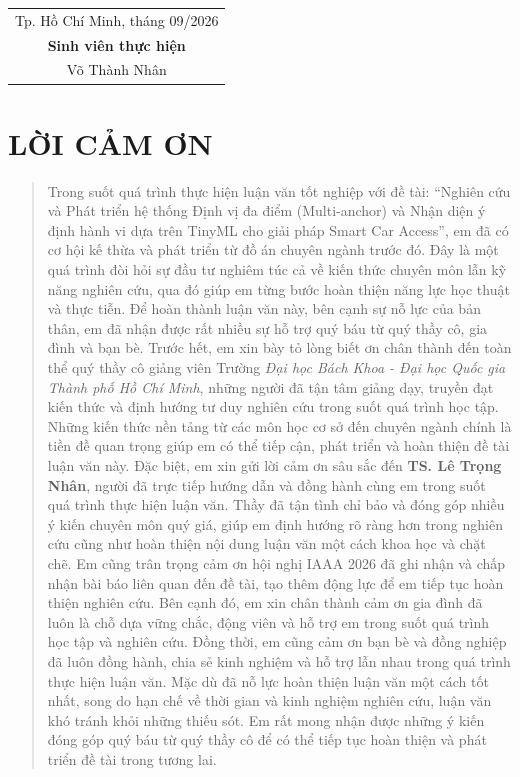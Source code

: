 \documentclass[a4paper,12pt,twoside]{report}
\begin{document}
\begin{flushright}
\begin{tabular}{c}
Tp. Hồ Chí Minh, tháng 09/2026\\
\textbf{Sinh viên thực hiện}\\
Võ Thành Nhân
\end{tabular}
\end{flushright}


\clearpage
{}
{}
\section*{\MakeUppercase{LỜI CẢM ƠN}}
\begin{quotation}
Trong suốt quá trình thực hiện luận văn tốt nghiệp với đề tài: “Nghiên cứu và Phát triển hệ thống Định vị đa điểm (Multi-anchor) và Nhận diện ý định hành vi dựa trên TinyML cho giải pháp Smart Car Access”, em đã có cơ hội kế thừa và phát triển từ đồ án chuyên ngành trước đó. Đây là một quá trình đòi hỏi sự đầu tư nghiêm túc cả về kiến thức chuyên môn lẫn kỹ năng nghiên cứu, qua đó giúp em từng bước hoàn thiện năng lực học thuật và thực tiễn. Để hoàn thành luận văn này, bên cạnh sự nỗ lực của bản thân, em đã nhận được rất nhiều sự hỗ trợ quý báu từ quý thầy cô, gia đình và bạn bè.
\singlespacing 
Trước hết, em xin bày tỏ lòng biết ơn chân thành đến toàn thể quý thầy cô giảng viên Trường \textit{Đại học Bách Khoa - Đại học Quốc gia Thành phố Hồ Chí Minh}, những người đã tận tâm giảng dạy, truyền đạt kiến thức và định hướng tư duy nghiên cứu trong suốt quá trình học tập. Những kiến thức nền tảng từ các môn học cơ sở đến chuyên ngành chính là tiền đề quan trọng giúp em có thể tiếp cận, phát triển và hoàn thiện đề tài luận văn này.
\singlespacing 
Đặc biệt, em xin gửi lời cảm ơn sâu sắc đến \textbf{TS. Lê Trọng Nhân}, người đã trực tiếp hướng dẫn và đồng hành cùng em trong suốt quá trình thực hiện luận văn. Thầy đã tận tình chỉ bảo và đóng góp nhiều ý kiến chuyên môn quý giá, giúp em định hướng rõ ràng hơn trong nghiên cứu cũng như hoàn thiện nội dung luận văn một cách khoa học và chặt chẽ. Em cũng trân trọng cảm ơn hội nghị IAAA 2026 đã ghi nhận và chấp nhận bài báo liên quan đến đề tài, tạo thêm động lực để em tiếp tục hoàn thiện nghiên cứu.
\singlespacing 
Bên cạnh đó, em xin chân thành cảm ơn gia đình đã luôn là chỗ dựa vững chắc, động viên và hỗ trợ em trong suốt quá trình học tập và nghiên cứu. Đồng thời, em cũng cảm ơn bạn bè và đồng nghiệp đã luôn đồng hành, chia sẻ kinh nghiệm và hỗ trợ lẫn nhau trong quá trình thực hiện luận văn. 
\singlespacing 
Mặc dù đã nỗ lực hoàn thiện luận văn một cách tốt nhất, song do hạn chế về thời gian và kinh nghiệm nghiên cứu, luận văn khó tránh khỏi những thiếu sót. Em rất mong nhận được những ý kiến đóng góp quý báu từ quý thầy cô để có thể tiếp tục hoàn thiện và phát triển đề tài trong tương lai.


\end{quotation}
\end{document}
